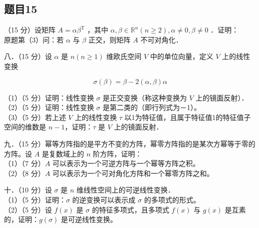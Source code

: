 \documentclass{article}
\begin{document}
\subsection{题目15}
（15 分）设矩阵 \(A=\alpha \beta^{\mathrm{T}}\) ，其中 \(\alpha, \beta \in \mathbb{R}^{n}(n \geq 2), \alpha \neq 0, \beta \neq 0\) ．证明：\\
原题第（3）问：若 \(\alpha\) 与 \(\beta\) 正交，则矩阵 \(A\) 不可对角化．

八．（15 分）设 \(\alpha\) 是 \(n(n \geq 1)\) 维欧氏空间 \(V\) 中的单位向量，定义 \(V\) 上的线性变换

\[
\sigma(\beta)=\beta-2(\alpha, \beta) \alpha
\]

（1）（5 分）证明：线性变换 \(\sigma\) 是正交变换（称这种变换为 \(V\) 上的镜面反射）．\\
（2）（5 分）证明：线性变换 \(\sigma\) 是第二类的（即行列式为－1）。\\
（3）（5 分）若上述 \(V\) 上的线性变换 \(\tau\) 以1为特征值，且属于特征值1的特征值子空间的维数是 \(n-1\)，证明：\(\tau\) 是 \(V\) 上的镜面反射．

九．（15 分）幂等方阵指的是平方不变的方阵，幂零方阵指的是某次方幂等于零的方阵。设 \(A\) 是复数域上的 \(n\) 阶方阵，证明：\\
（1）（7 分）\(A\) 可以表示为一个可逆方阵与一个幂等方阵之积。\\
（2）（8 分）\(A\) 可以表示为一个可对角化方阵和一个幂零方阵之和。

十．（10 分）设 \(\sigma\) 是 \(n\) 维线性空间上的可逆线性变换．\\
（1）（5 分）证明：\(\sigma\) 的逆变换可以表示成 \(\sigma\) 的多项式的形式。\\
（2）（5 分）设 \(f(x)\) 是 \(\sigma\) 的特征多项式，且多项式 \(f(x)\) 与 \(g(x)\) 是互素的，证明：\(g(\sigma)\) 是可逆线性变换。
\end{document}
